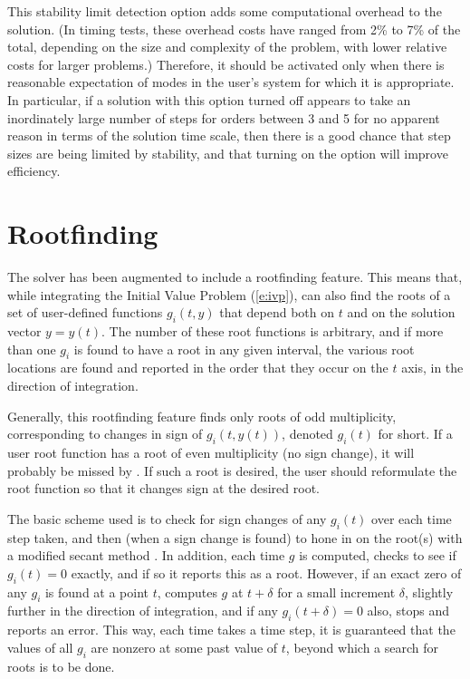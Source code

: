 This stability limit detection option adds some computational overhead
to the {\cvodes} solution.  (In timing tests, these overhead costs
have ranged from 2\% to 7\% of the total, depending on the size and
complexity of the problem, with lower relative costs for larger
problems.)  Therefore, it should be activated only when there is
reasonable expectation of modes in the user's system for which it is
appropriate.  In particular, if a {\cvodes} solution with this option
turned off appears to take an inordinately large number of steps for
orders between 3 and 5 for no apparent reason in terms of the solution time scale,
then there is a good chance that step sizes are being limited by
stability, and that turning on the option will improve efficiency.

\section{Rootfinding}\label{ss:rootfinding}

The {\cvodes} solver has been augmented to include a rootfinding
feature.  This means that, while integrating the Initial Value Problem
(\ref{e:ivp}), {\cvodes} can also find the roots of a set of user-defined
functions $g_i(t,y)$ that depend both on $t$ and on the solution vector 
$y = y(t)$.  The number of these root functions is arbitrary, and if
more than one $g_i$ is found to have a root in any given interval, the
various root locations are found and reported in the order that they
occur on the $t$ axis, in the direction of integration.

Generally, this rootfinding feature finds only roots of odd
multiplicity, corresponding to changes in sign of $g_i(t,y(t))$,
denoted $g_i(t)$ for short.  If a user root function has a root of
even multiplicity (no sign change), it will probably be missed by
{\cvodes}.  If such a root is desired, the user should reformulate the
root function so that it changes sign at the desired root.

The basic scheme used is to check for sign changes of any $g_i(t)$ over
each time step taken, and then (when a sign change is found) to hone
in on the root(s) with a modified secant method \cite{HeSh:80}.  
In addition, each time $g$ is computed, {\cvodes} checks to see if 
$g_i(t) = 0$ exactly, and if so it reports this as a root.  However,
if an exact zero of any $g_i$ is found at a point $t$, {\cvodes}
computes $g$ at $t + \delta$ for a small increment $\delta$, slightly
further in the direction of integration, and if any $g_i(t + \delta)=0$ 
also, {\cvodes} stops and reports an error.  This way, each time
{\cvodes} takes a time step, it is guaranteed that the values of all
$g_i$ are nonzero at some past value of $t$, beyond which a search for
roots is to be done.


